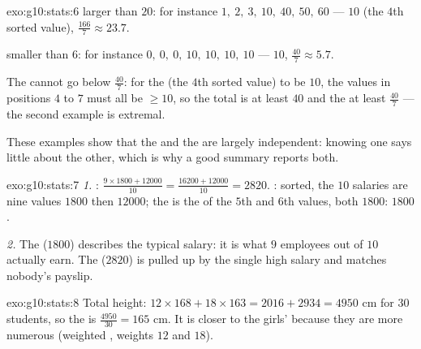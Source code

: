 \begin{solution}{exo:g10:stats:6}
 larger than $20$: for instance
$1,\ 2,\ 3,\ 10,\ 40,\ 50,\ 60$ ---  $10$ (the $4$th sorted value),
 $\frac{166}{7} \approx 23.7$.

 smaller than $6$: for instance
$0,\ 0,\ 0,\ 10,\ 10,\ 10,\ 10$ ---  $10$, 
$\frac{40}{7} \approx 5.7$.

The  cannot go below $\frac{40}{7}$: for the  (the $4$th sorted
value) to be $10$, the values in positions $4$ to $7$ must all be
$\geq 10$, so the total is at least $40$ and the  at least
$\frac{40}{7}$ --- the second example is extremal.

These examples show that the  and the  are largely independent:
knowing one says little about the other, which is why a good summary
reports both.
\end{solution}

\begin{solution}{exo:g10:stats:7}
\emph{1.} :
$\frac{9 \times 1800 + 12000}{10} = \frac{16200 + 12000}{10} = 2820$.
: sorted, the $10$ salaries are nine values $1800$ then $12000$;
the  is the  of the $5$th and $6$th values, both $1800$:
 $1800$.

\emph{2.} The  ($1800$) describes the typical salary: it is what
$9$ employees out of $10$ actually earn. The  ($2820$) is pulled up
by the single high salary and matches nobody's payslip.
\end{solution}

\begin{solution}{exo:g10:stats:8}
Total height: $12 \times 168 + 18 \times 163 = 2016 + 2934 = 4950$ cm for
$30$ students, so the  is $\frac{4950}{30} = 165$ cm. It is closer to
the girls'  because they are more numerous (weighted , weights
$12$ and $18$).
\end{solution}

